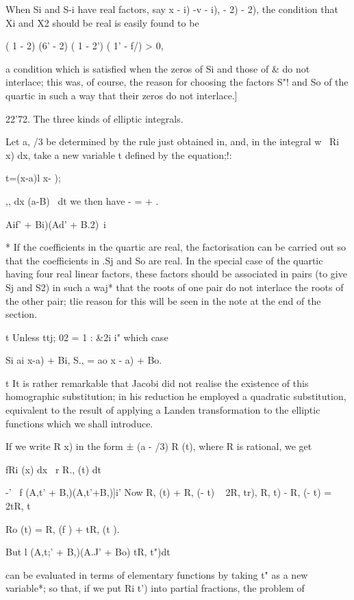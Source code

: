 When Si and S-i have real factors, say x - i) -v - i), - 2) - 2), the
condition that Xi and X2 should be real is easily found to be

( 1 - 2) (6' - 2) ( 1 - 2') ( 1' - f/) > 0,

a condition which is satisfied when the zeros of Si and those of \& do
not interlace; this was, of course, the reason for choosing the
factors S"! and So of the quartic in such a way that their zeros do
not interlace.]

22'72. The three kinds of elliptic integrals.

Let a, /3 be determined by the rule just obtained in, and, in
the integral w~ Ri x) dx, take a new variable t defined by the
equation;!:

t=(x-a)l x- );

,, dx (a-B)~ dt we then have - = + .

    Aif' + Bi)(Ad' + B.2)\ i

* If the coefficients in the quartic are real, the factorisation can
be carried out so that the coefficients in .Sj and So are real. In the
special case of the quartic having four real linear factors, these
factors should be associated in pairs (to give Sj and S2) in such a
waj* that the roots of one pair do not interlace the roots of the
other pair; tlie reason for this will be seen in the note at the end
of the section.

t Unless ttj; 02 = 1 : \&2i i" which case

Si ai x-a) + Bi, S., = ao x - a) + Bo.

t It is rather remarkable that Jacobi did not realise the existence of
this homographic substitution; in his reduction he employed a
quadratic substitution, equivalent to the result of applying a Landen
transformation to the elliptic functions which we shall introduce.

%
%

If we write R x) in the form ± (a - /3) R (t), where R is rational, we
get

fRi (x) dx \ r R., (t) dt

-' ~f (A,t' + B,)(A,t'+B,)]i' Now R, (t) + R, (- t) ~ 2R, tr), R, t) -
R, (- t) = 2tR, t%

Ro (t) = R, (f ) + tR, (t ).

But l (A,t;' + B,)(A.J' + Bo) tR, t")dt

can be evaluated in terms of elementary functions by taking t" as a
new variable*; so that, if we put Ri t') into partial fractions, the
problem of

